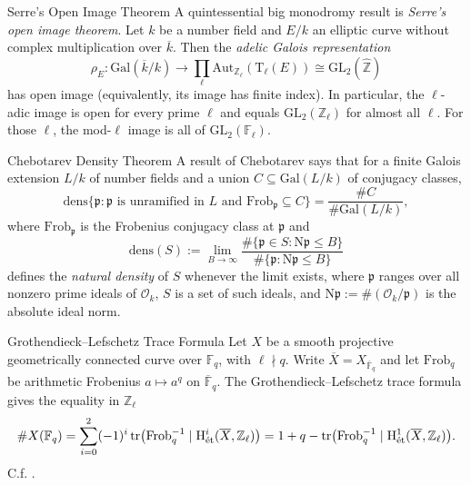\documentclass[11pt,letterpaper]{article}
\theoremstyle{numberfirstplain}
\numberwithin{equation}{theorem}
\theoremstyle{numberfirstupright}
\begin{document}
\begin{custom}{Serre's Open Image Theorem}\label{thm:serre-open-image}
  A quintessential big monodromy result is \textit{Serre's open image theorem}.
  Let $k$ be a number field and $E/k$ an elliptic curve without complex multiplication over $\overline{k}$. 
  Then the \textit{adelic Galois representation}
  \[
    \rho_E:\mathrm{Gal}(\overline{k}/k)
    \longrightarrow \prod_{\ell}\mathrm{Aut}_{\mathbb Z_\ell}(\mathrm{T}_\ell(E))
    \cong \mathrm{GL}_2(\widehat{\mathbb Z})
  \]
  has open image (equivalently, its image has finite index). In particular, the $\ell$-adic image is open for every prime $\ell$ and equals $\mathrm{GL}_2(\mathbb Z_\ell)$ for almost all $\ell$. 
  For those $\ell$, the mod-$\ell$ image is all of $\mathrm{GL}_2(\mathbb F_\ell)$. 
\end{custom}

\begin{custom}{Chebotarev Density Theorem}\label{thm:chebotarev-density}
  A result of Chebotarev \cite[\S2.1, Theorem~1]{Serre1981Chebotarev} says that for a finite Galois extension $L/k$ of number fields and a union $C\subseteq \mathrm{Gal}(L/k)$ of conjugacy classes,
  \[
    \mathrm{dens}\{\mathfrak p:\mathfrak p\text{ is unramified in }L \text{\ and\ }
      \mathrm{Frob}_{\mathfrak p}\subseteq C\}
    =\frac{\#C}{\# \mathrm{Gal}(L/k)},
  \]
  where $\mathrm{Frob}_{\mathfrak p}$ is the Frobenius conjugacy class at $\mathfrak p$ and
  \[
    \mathrm{dens}(S):=\lim_{B\to\infty}
    \frac{\#\{\mathfrak p\in S:\mathrm N\mathfrak p\le B\}}
         {\#\{\mathfrak p:\mathrm N\mathfrak p\le B\}}
  \]
  defines the \textit{natural density} of $S$ whenever the limit exists, where $\mathfrak p$ ranges over all nonzero prime ideals of $\mathcal O_k$, $S$ is a set of such ideals, and $\mathrm N\mathfrak p:=\#(\mathcal O_k/\mathfrak p)$ is the absolute ideal norm.
\end{custom}
\begin{custom}{Grothendieck–Lefschetz Trace Formula}\label{thm:grothendieck-lefschetz-trace}
Let $X$ be a smooth projective geometrically connected curve over $\mathbb F_q$, with $\ell\nmid q$. Write $\overline X=X_{\overline{\mathbb F}_q}$ and let $\mathrm{Frob}_q$ be arithmetic Frobenius $a\mapsto a^q$ on $\overline{\mathbb F}_q$. The Grothendieck--Lefschetz trace formula gives the equality in $\mathbb Z_\ell$
\[
  \#X(\mathbb F_q)
  =\sum_{i=0}^2(-1)^i\,
    \mathrm{tr}\bigl(\mathrm{Frob}_q^{-1}\mid
    \mathrm H^i_{\mathrm{\acute{e}t}}(\overline X,\mathbb Z_\ell)\bigr)\\
  =1+q-\mathrm{tr}\bigl(\mathrm{Frob}_q^{-1}\mid
    \mathrm H^1_{\mathrm{\acute{e}t}}(\overline X,\mathbb Z_\ell)\bigr).
\]
C.f. \cite[Theorem~64.14.4 and Lemma~64.14.6]{StacksProject}.
\end{custom}
\end{document}
